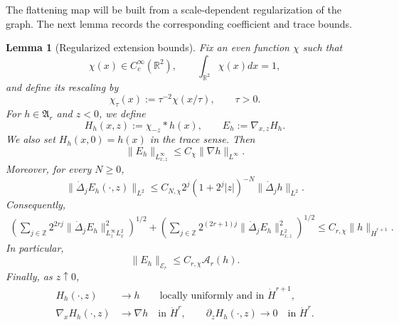 \documentclass[12pt]{amsart}
\newtheorem{lemma}[theorem]{Lemma}
\theoremstyle{remark}
\theoremstyle{definition}
\numberwithin{equation}{section}
\newcommand{\R}{\mathbb{R}}
\begin{document}
The flattening map will be built from a scale-dependent regularization of the graph. 
The next lemma records the corresponding coefficient and trace bounds.

\begin{lemma}[Regularized extension bounds]
\label{lem:regularized-extension-two-level}
Fix an even function \(\chi\) such that
\[
 \chi(x)\in C^\infty_c(\R^2), \qquad \int_{\R^2}\chi(x) dx =1,
\]
and define its rescaling by
\[
 \chi_\tau(x):=\tau^{-2}\chi(x/\tau), \qquad \tau>0.
\]
For \(h\in\mathfrak A_r\) and \(z<0\), we define
\[
 H_h(x,z):=\chi_{-z}*h(x), \qquad E_h:=\nabla_{x,z}H_h.
\]
We also set \(H_h(x,0)=h(x)\) in the trace sense.
Then
\begin{equation}
\label{eq:Eh-Linfty}
 \|E_h\|_{L^\infty_{x,z}} \leq C_\chi\|\nabla h\|_{L^\infty}.
\end{equation}
Moreover, for every \(N\geq0\),
\begin{equation*}
 \|\dot\Delta_jE_h(\cdot,z)\|_{L^2} \leq C_{N,\chi} 2^j(1+2^j|z|)^{-N} \|\dot\Delta_jh\|_{L^2}.
\end{equation*}
Consequently,
\begin{align}
\label{eq:Eh-high}
 \left( \sum_{j\in\mathbb Z} 2^{2rj} \|\dot\Delta_jE_h\|_{L^\infty_zL^2_x}^2 \right)^{1/2}+ \left( \sum_{j\in\mathbb Z} 2^{(2r+1)j} \|\dot\Delta_jE_h\|_{L^2_{x,z}}^2 \right)^{1/2} \leq C_{r,\chi}\|h\|_{\dot H^{r+1}}.
\end{align}
In particular,
\begin{equation*}
 \|E_h\|_{\mathcal E_r} \leq C_{r,\chi}\mathcal A_r(h).
\end{equation*}
Finally, as \(z\uparrow0\),
\begin{equation}
\label{eq:regularized-extension-boundary-traces}
\begin{aligned}
 H_h(\cdot,z)&\longrightarrow h \qquad \text{locally uniformly and in }\dot H^{r+1},\\
 \nabla_xH_h(\cdot,z)&\longrightarrow\nabla h \quad\text{in }\dot H^r,
 \qquad \partial_zH_h(\cdot,z)\longrightarrow0 \quad\text{in }\dot H^r.
\end{aligned}
\end{equation}
\end{lemma}
\end{document}
